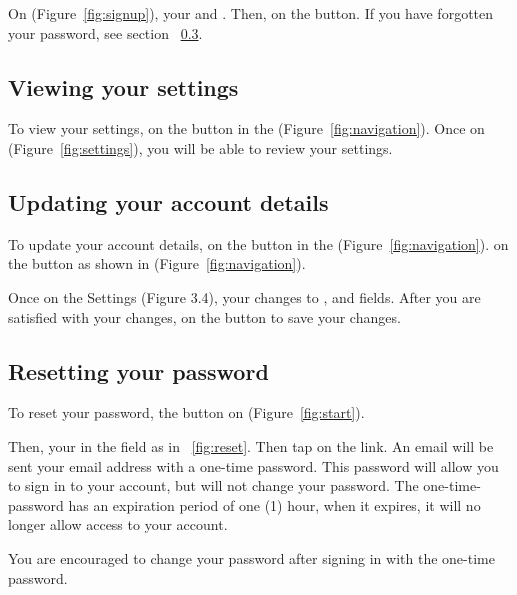 
On  (Figure~\ref{fig:signup}),  your  and .  Then,  on the  button.  If you have forgotten your password, see section ~\ref{sec:reset}. 
\subsection{Viewing your settings}
\label{sec:settings}
To view your settings,  on the  button in the  (Figure~\ref{fig:navigation}). Once on  (Figure~\ref{fig:settings}), you will be able to review your settings. 

\subsection{Updating your account details}
\label{sec:account-update}
To update your account details,  on the  button in the  (Figure~\ref{fig:navigation}).   on the  button as shown in (Figure~\ref{fig:navigation}).

Once on the Settings (Figure 3.4),  your changes to ,  and  fields. After you are satisfied with your changes,  on the  button to save your changes.

\subsection{Resetting your password}
\label{sec:reset}
To reset your password,  the  button on  (Figure~\ref{fig:start}).

Then,  your  in the  field as in ~\ref{fig:reset}. Then tap on the  link. An email will be sent your email address with a one-time password.  This password will allow you to sign in to your account, but will not change your password. The one-time-password has an expiration period of one (1) hour, when it expires, it will no longer allow access to your account.

You are encouraged to change your password after signing in with the one-time password.

